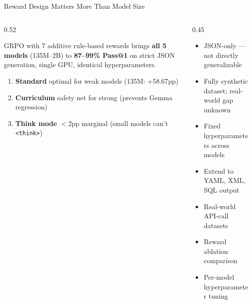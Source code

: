 \documentclass[10pt, aspectratio=169]{beamer}
\begin{document}
\begin{frame}{Reward Design Matters More Than Model Size}
  \begin{columns}[T]
    \begin{column}{0.52\textwidth}
      \begin{tcolorbox}[insightbox=accent, title={\small\color{accent} Main Message}]
        \scriptsize
        GRPO with 7 additive rule-based rewards brings \textbf{all 5 models} (135M--2B) to \textbf{87--99\% Pass@1} on strict JSON generation, single GPU, identical hyperparameters.
      \end{tcolorbox}
      \vspace{0.3em}
      \begin{tcolorbox}[insightbox=sky, title={\small\color{sky} Takeaways}]
        \scriptsize
        \begin{enumerate}
          \setlength\itemsep{0.2em}
          \item \textbf{Standard} optimal for weak models (135M: \textcolor{accent}{+58.67pp})
          \item \textbf{Curriculum} safety net for strong (prevents Gemma regression)
          \item \textbf{Think mode} $<$2pp marginal (small models can't \texttt{<think>})
        \end{enumerate}
      \end{tcolorbox}
    \end{column}
    \begin{column}{0.45\textwidth}
      \begin{tcolorbox}[insightbox=gold, title={\small\color{gold} Limitations}]
        \scriptsize
        \begin{itemize}
          \setlength\itemsep{0.2em}
          \item JSON-only — not directly generalizable
          \item Fully synthetic dataset; real-world gap unknown
          \item Fixed hyperparameters across models
        \end{itemize}
      \end{tcolorbox}
      \vspace{0.3em}
      \begin{tcolorbox}[insightbox=purple, title={\small\color{purple} Future Work}]
        \scriptsize
        \begin{itemize}
          \setlength\itemsep{0.2em}
          \item Extend to YAML, XML, SQL output
          \item Real-world API-call datasets
          \item Reward ablation comparison
          \item Per-model hyperparameter tuning
        \end{itemize}
      \end{tcolorbox}
    \end{column}
  \end{columns}
\end{frame}
\end{document}
